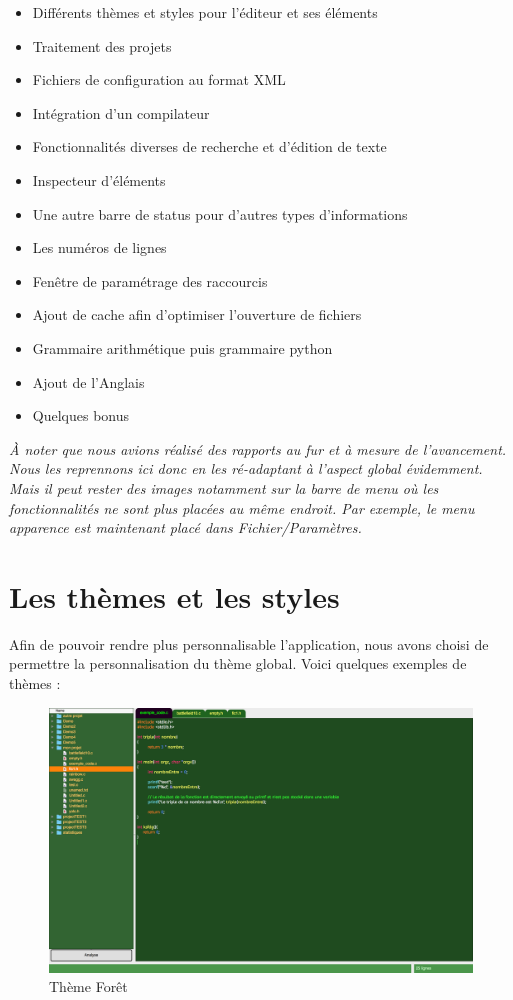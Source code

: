 \documentclass[a4paper,12pt]{article}
\begin{document}
		\begin{itemize}
			\item Différents thèmes et styles pour l'éditeur et ses éléments
			\item Traitement des projets
			\item Fichiers de configuration au format XML
			\item Intégration d'un compilateur
			\item Fonctionnalités diverses de recherche et d'édition de texte
			\item Inspecteur d'éléments
			\item Une autre barre de status pour d'autres types d'informations
			\item Les numéros de lignes
			\item Fenêtre de paramétrage des raccourcis
			\item Ajout de cache afin d'optimiser l'ouverture de fichiers
			\item Grammaire arithmétique puis grammaire python
			\item Ajout de l'Anglais
			\item Quelques bonus \\
		\end{itemize}
		
		\textit{À noter que nous avions réalisé des rapports au fur et à mesure de l'avancement. Nous les reprennons ici donc en les ré-adaptant à l'aspect global évidemment. Mais il peut rester des images notamment sur la barre de menu où les fonctionnalités ne sont plus placées au même endroit. Par exemple, le menu apparence est maintenant placé dans Fichier/Paramètres.}
		
		
\section{Les thèmes et les styles}
	
	Afin de pouvoir rendre plus personnalisable l'application, nous avons choisi de permettre la personnalisation du thème global.
	Voici quelques exemples de thèmes : 
	
	
		\begin{figure}[h!]
			\begin{center}
				\includegraphics[scale=0.23]{images/imgs_themes/theme_forest}
				\caption{Thème Forêt}
			\end{center}
		\end{figure}
		
\end{document}

